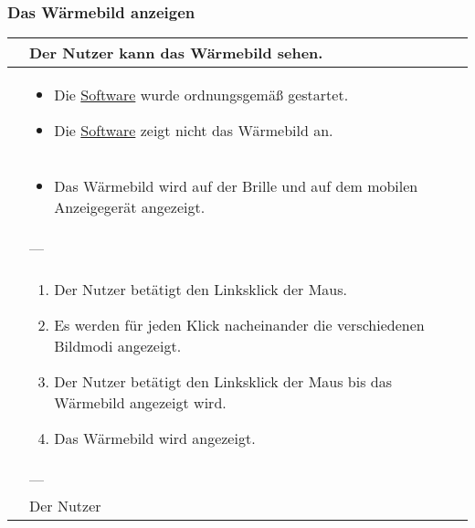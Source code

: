 \subsubsection{Das Wärmebild anzeigen}
\begin{center}
	\begin{longtable}{| p{3cm} | p{12cm} |}
		\hline
		\goal & Der Nutzer kann das Wärmebild sehen. \\ \hline
		
		\precondition & \begin{itemize}
			\item Die \hyperlink{tab:anwendung}{Software} wurde ordnungsgemäß gestartet.
			\item Die \hyperlink{tab:anwendung}{Software} zeigt nicht das Wärmebild an.
		\end{itemize} \\ \hline
		
		\postcondition & \begin{itemize}
			\item Das Wärmebild wird auf der Brille und auf dem mobilen Anzeigegerät angezeigt.
		\end{itemize} \\ \hline
		
		\postexception & --- \\ \hline
		
		\flow & \begin{enumerate}
			\item Der Nutzer betätigt den Linksklick der Maus.
			\item Es werden für jeden Klick nacheinander die verschiedenen Bildmodi angezeigt.
			\item Der Nutzer betätigt den Linksklick der Maus bis das Wärmebild angezeigt wird.
			\item Das Wärmebild wird angezeigt.			
		\end{enumerate} \\ \hline
		
		\exception & --- \\ \hline
		
		\player & Der Nutzer \\
		\hline
	\end{longtable}
\end{center}

